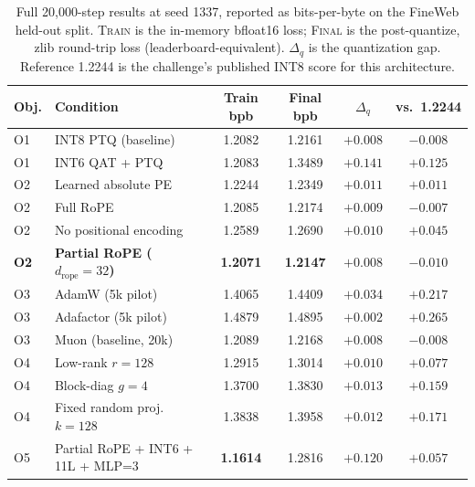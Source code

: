 \documentclass[11pt, letterpaper]{article}
\begin{document}
\begin{table}[H]
\centering
\small
\begin{tabular}{@{}l l c c c c@{}}
\toprule
\textbf{Obj.} & \textbf{Condition} & \textbf{Train bpb}
              & \textbf{Final bpb} & $\Delta_q$
              & \textbf{vs.\ 1.2244} \\
\midrule
O1 & INT8 PTQ (baseline)              & 1.2082 & 1.2161 & $+0.008$ & $-0.008$ \\
O1 & INT6 QAT + PTQ                   & 1.2083 & 1.3489 & $+0.141$ & $+0.125$ \\
\midrule
O2 & Learned absolute PE              & 1.2244 & 1.2349 & $+0.011$ & $+0.011$ \\
O2 & Full RoPE                        & 1.2085 & 1.2174 & $+0.009$ & $-0.007$ \\
O2 & No positional encoding           & 1.2589 & 1.2690 & $+0.010$ & $+0.045$ \\
\textbf{O2} & \textbf{Partial RoPE ($d_{\text{rope}}{=}32$)}
                                      & \textbf{1.2071} & \textbf{1.2147}
                                      & $+0.008$ & $\mathbf{-0.010}$ \\
\midrule
O3 & AdamW (5k pilot)                 & 1.4065 & 1.4409 & $+0.034$ & $+0.217$ \\
O3 & Adafactor (5k pilot)             & 1.4879 & 1.4895 & $+0.002$ & $+0.265$ \\
O3 & Muon (baseline, 20k)             & 1.2089 & 1.2168 & $+0.008$ & $-0.008$ \\
\midrule
O4 & Low-rank $r{=}128$               & 1.2915 & 1.3014 & $+0.010$ & $+0.077$ \\
O4 & Block-diag $g{=}4$               & 1.3700 & 1.3830 & $+0.013$ & $+0.159$ \\
O4 & Fixed random proj.\ $k{=}128$    & 1.3838 & 1.3958 & $+0.012$ & $+0.171$ \\
\midrule
O5 & Partial RoPE + INT6 + 11L + MLP=3 & \textbf{1.1614} & 1.2816 & $\mathbf{+0.120}$ & $+0.057$ \\
\bottomrule
\end{tabular}
\caption{Full 20{,}000-step results at seed 1337, reported as
bits-per-byte on the FineWeb held-out split. \textsc{Train} is
the in-memory bfloat16 loss; \textsc{Final} is the post-quantize,
zlib round-trip loss (leaderboard-equivalent). $\Delta_q$ is the
quantization gap. Reference 1.2244 is the challenge's published
INT8 score for this architecture.}
\label{tab:results}
\end{table}
\end{document}
